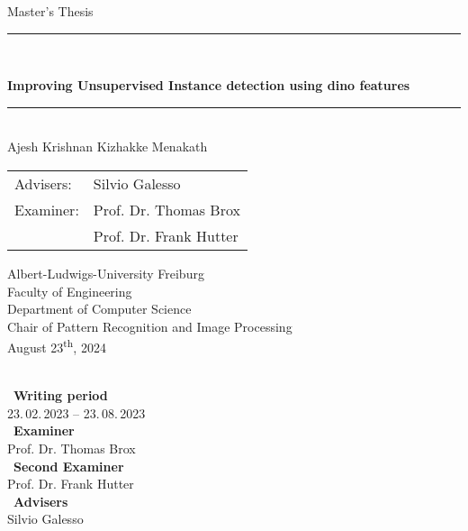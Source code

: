 
\begin{titlepage}
\begin{center}

\newcommand{\HorizontalLine}{\rule{\linewidth}{0.3mm}}

{\Large Master's Thesis}\\[1.3cm]


\HorizontalLine \\[0.4cm]
\begin{spacing}{2
}
    {\huge \bfseries Improving Unsupervised Instance detection using dino features} \\
\end{spacing}
\HorizontalLine \\[1.5cm]


{\Huge Ajesh Krishnan Kizhakke Menakath} \\[2cm]


\begin{tabular}[hc]{>{\huge}l >{\huge}l}
  
  Advisers: & Silvio Galesso \\[1.2cm]
  Examiner: & Prof. Dr. Thomas Brox \\[0.2cm]
    &          Prof. Dr. Frank Hutter \\[0.3cm]
\end{tabular}
\vfill  %

\Large {
    Albert-Ludwigs-University Freiburg\\
    Faculty of Engineering\\
    Department of Computer Science\\
    Chair of Pattern Recognition and Image Processing\\[1cm]

    August 23\textsuperscript{th}, 2024\\
}
\end{center}
\end{titlepage}

\ \vfill \ \\  %
\
\textbf{Writing period}            \smallskip{} \\
23.\,02.\,2023 -- 23.\,08.\,2023   \bigskip{} \\
\
\textbf{Examiner}                  \smallskip{} \\
Prof. Dr. Thomas Brox              \bigskip{} \\
\
\textbf{Second Examiner}                  \smallskip{} \\
Prof. Dr. Frank Hutter              \bigskip{} \\
\
\textbf{Advisers}                  \smallskip{} \\
Silvio Galesso

